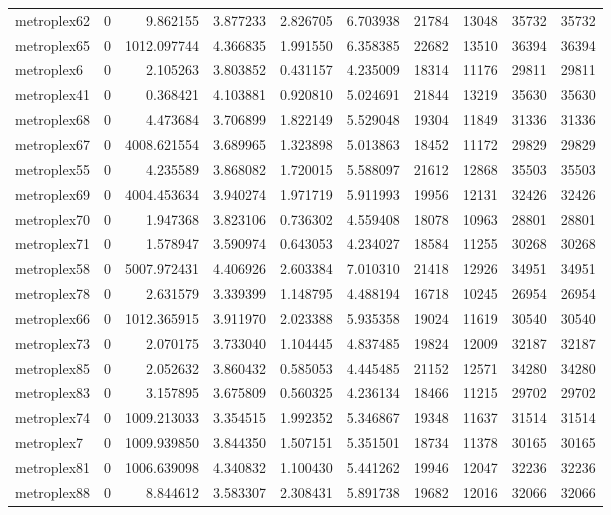 \begin{longtable}{|l|r|r|r|r|r|r|r|r|r|}
metroplex62 & 0 & 9.862155 & 3.877233 & 2.826705 & 6.703938 & 21784 & 13048 & 35732 & 35732 \\
metroplex65 & 0 & 1012.097744 & 4.366835 & 1.991550 & 6.358385 & 22682 & 13510 & 36394 & 36394 \\
metroplex6 & 0 & 2.105263 & 3.803852 & 0.431157 & 4.235009 & 18314 & 11176 & 29811 & 29811 \\
metroplex41 & 0 & 0.368421 & 4.103881 & 0.920810 & 5.024691 & 21844 & 13219 & 35630 & 35630 \\
metroplex68 & 0 & 4.473684 & 3.706899 & 1.822149 & 5.529048 & 19304 & 11849 & 31336 & 31336 \\
metroplex67 & 0 & 4008.621554 & 3.689965 & 1.323898 & 5.013863 & 18452 & 11172 & 29829 & 29829 \\
metroplex55 & 0 & 4.235589 & 3.868082 & 1.720015 & 5.588097 & 21612 & 12868 & 35503 & 35503 \\
metroplex69 & 0 & 4004.453634 & 3.940274 & 1.971719 & 5.911993 & 19956 & 12131 & 32426 & 32426 \\
metroplex70 & 0 & 1.947368 & 3.823106 & 0.736302 & 4.559408 & 18078 & 10963 & 28801 & 28801 \\
metroplex71 & 0 & 1.578947 & 3.590974 & 0.643053 & 4.234027 & 18584 & 11255 & 30268 & 30268 \\
metroplex58 & 0 & 5007.972431 & 4.406926 & 2.603384 & 7.010310 & 21418 & 12926 & 34951 & 34951 \\
metroplex78 & 0 & 2.631579 & 3.339399 & 1.148795 & 4.488194 & 16718 & 10245 & 26954 & 26954 \\
metroplex66 & 0 & 1012.365915 & 3.911970 & 2.023388 & 5.935358 & 19024 & 11619 & 30540 & 30540 \\
metroplex73 & 0 & 2.070175 & 3.733040 & 1.104445 & 4.837485 & 19824 & 12009 & 32187 & 32187 \\
metroplex85 & 0 & 2.052632 & 3.860432 & 0.585053 & 4.445485 & 21152 & 12571 & 34280 & 34280 \\
metroplex83 & 0 & 3.157895 & 3.675809 & 0.560325 & 4.236134 & 18466 & 11215 & 29702 & 29702 \\
metroplex74 & 0 & 1009.213033 & 3.354515 & 1.992352 & 5.346867 & 19348 & 11637 & 31514 & 31514 \\
metroplex7 & 0 & 1009.939850 & 3.844350 & 1.507151 & 5.351501 & 18734 & 11378 & 30165 & 30165 \\
metroplex81 & 0 & 1006.639098 & 4.340832 & 1.100430 & 5.441262 & 19946 & 12047 & 32236 & 32236 \\
metroplex88 & 0 & 8.844612 & 3.583307 & 2.308431 & 5.891738 & 19682 & 12016 & 32066 & 32066 \\

\end{longtable}
